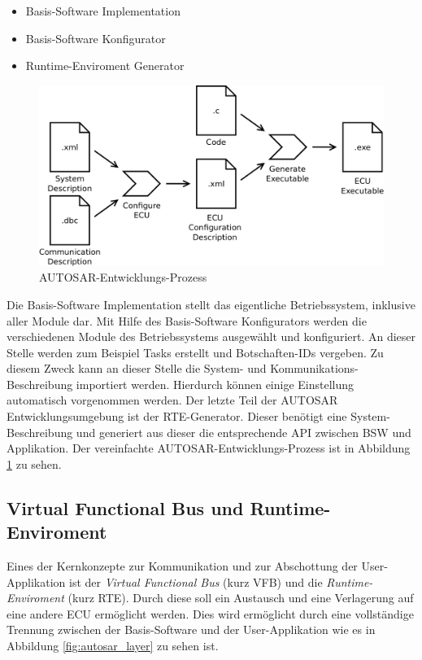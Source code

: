 \documentclass[
  a4paper,					    %
  twoside,
  DIV=calc,     				%
  bibliography=totoc,
  cleardoublepage=empty,
  ngerman,     					%
  final       					%
]{scrbook}
\begin{document}
\begin{itemize}
    \item Basis-Software Implementation
    \item Basis-Software Konfigurator
    \item Runtime-Enviroment Generator
\end{itemize}

\begin{figure}[ht]
    \centering
    \includegraphics[width=1\textwidth]{Autosar_Prozess.png}
    \caption{AUTOSAR-Entwicklungs-Prozess}
    \label{fig:autosar_prozess}
\end{figure}

Die Basis-Software Implementation stellt das eigentliche Betriebssystem, inklusive aller Module dar. Mit Hilfe des Basis-Software Konfigurators werden die verschiedenen Module des Betriebssystems ausgewählt und konfiguriert. An dieser Stelle werden zum Beispiel Tasks erstellt und Botschaften-IDs vergeben. Zu diesem Zweck kann an dieser Stelle die System- und Kommunikations-Beschreibung importiert werden. Hierdurch können einige Einstellung automatisch vorgenommen werden. Der letzte Teil der AUTOSAR Entwicklungsumgebung ist der RTE-Generator. Dieser benötigt eine System-Beschreibung und generiert aus dieser die entsprechende API zwischen BSW und Applikation. Der vereinfachte AUTOSAR-Entwicklungs-Prozess ist in Abbildung \ref{fig:autosar_prozess} zu sehen.



\subsection{Virtual Functional Bus und Runtime-Enviroment}
\label{sec:vfb}
Eines der Kernkonzepte zur Kommunikation und zur Abschottung der User-Applikation ist der \emph{Virtual Functional Bus} (kurz VFB) und die \emph{Runtime-Enviroment} (kurz RTE). Durch diese soll ein Austausch und eine Verlagerung auf eine andere ECU ermöglicht werden. Dies wird ermöglicht durch eine vollständige Trennung zwischen der Basis-Software und der User-Applikation wie es in Abbildung \ref{fig:autosar_layer} zu sehen ist. 
\end{document}
